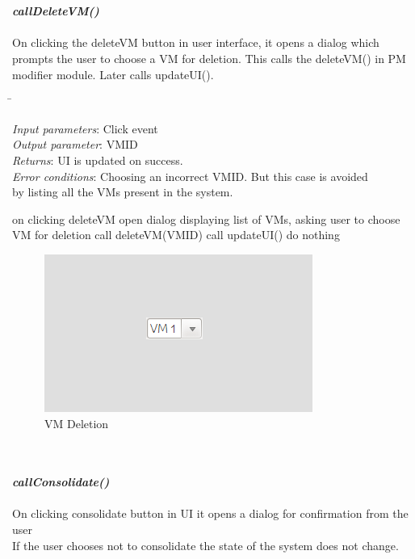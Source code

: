 ﻿\documentclass[a4paper,11pt]{article}
\begin{document}
\mbox{}\\\\
 \emph{\bf callDeleteVM()}\\\\
 On clicking the deleteVM button in user interface, it opens a dialog  which prompts the user to choose a VM for deletion.
 This calls the deleteVM() in PM modifier module. Later calls updateUI().
 \\  \begin{tabbing}
   \hspace*{4cm}\= \kill
 
 \emph{Input parameters}\>: Click event\\
 \emph{Output parameter}\>: VM\textunderscore ID\\
\emph{Returns}\>: UI is updated on success.\\
\emph{Error conditions}\>: Choosing an incorrect VM\textunderscore ID. But this case is avoided \\ \> by listing all the VMs present in the system.
\end{tabbing}
\begin{algorithmic}[1]
 \STATE on clicking deleteVM
 \STATE open dialog displaying list of VMs, asking user to choose VM for deletion
 \STATE call deleteVM(VM\textunderscore ID)
 \STATE call updateUI()
 \ELSE
 \STATE do nothing
 \ENDIF
 \end{algorithmic}
\begin{figure}[ht!]
\centering
\includegraphics[scale=0.8, angle=0]{4.png}
\caption{VM Deletion}
\end{figure}
\mbox{}\\\\
\emph{\bf callConsolidate()}\\\\
On clicking consolidate button in UI it opens a dialog for confirmation from the user \\
If the user chooses not to consolidate the state of the system does not change.\\
\end{document}

